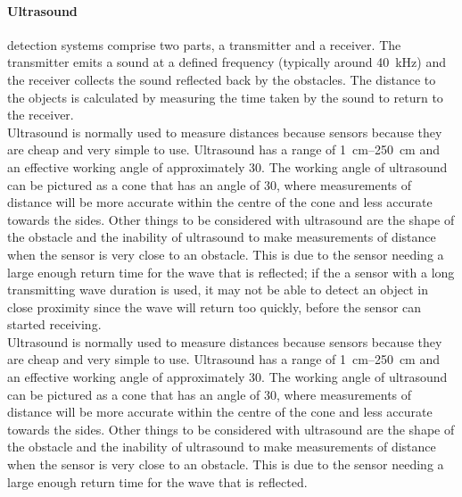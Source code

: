         \paragraph{Ultrasound} detection systems comprise two parts, a transmitter and a receiver. The transmitter emits a sound at a defined frequency (typically around \SI{40}{\kilo\hertz}) and the receiver collects the sound reflected back by the obstacles. The distance to the objects is calculated by measuring the time taken by the sound to return to the receiver.\\
        Ultrasound is normally used to measure distances because sensors because they are cheap and very simple to use. Ultrasound has a range of \SIrange{1}{250}{\centi\meter} and an effective working angle of approximately 30\dg.\cite{ultrasoundrobots} The working angle of ultrasound can be pictured as a cone that has an angle of 30\dg, where measurements of distance will be more accurate within the centre of the cone and less accurate towards the sides. Other things to be considered with ultrasound are the shape of the obstacle and the inability of ultrasound to make measurements of distance when the sensor is very close to an obstacle. This is due to the sensor needing a large enough return time for the wave that is reflected; if the a sensor with a long transmitting wave duration is used, it may not be able to detect an object in close proximity since the wave will return too quickly, before the sensor can started receiving.\\
        Ultrasound is normally used to measure distances because sensors because they are cheap and very simple to use. Ultrasound has a range of \SIrange{1}{250}{\centi\meter} and an effective working angle of approximately 30\dg.\cite{ultrasoundrobots} The working angle of ultrasound can be pictured as a cone that has an angle of 30\dg, where measurements of distance will be more accurate within the centre of the cone and less accurate towards the sides. Other things to be considered with ultrasound are the shape of the obstacle and the inability of ultrasound to make measurements of distance when the sensor is very close to an obstacle. This is due to the sensor needing a large enough return time for the wave that is reflected.

